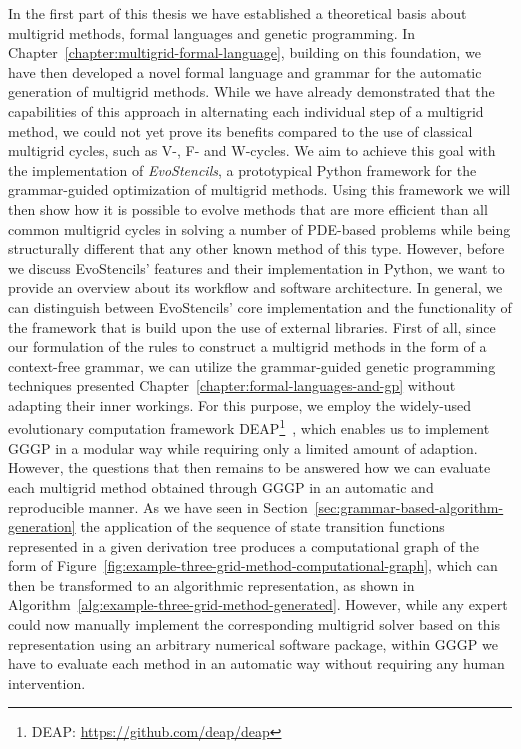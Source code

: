 In the first part of this thesis we have established a theoretical basis about multigrid methods, formal languages and genetic programming.
In Chapter~\ref{chapter:multigrid-formal-language}, building on this foundation, we have then developed a novel formal language and grammar for the automatic generation of multigrid methods. 
While we have already demonstrated that the capabilities of this approach in alternating each individual step of a multigrid method, we could not yet prove its benefits compared to the use of classical multigrid cycles, such as V-, F- and W-cycles.
We aim to achieve this goal with the implementation of \emph{EvoStencils}, a prototypical Python framework for the grammar-guided optimization of multigrid methods.
Using this framework we will then show how it is possible to evolve methods that are more efficient than all common multigrid cycles in solving a number of PDE-based problems while being structurally different that any other known method of this type.
However, before we discuss EvoStencils' features and their implementation in Python, we want to provide an overview about its workflow and software architecture.
In general, we can distinguish between EvoStencils' core implementation and the functionality of the framework that is build upon the use of external libraries.
First of all, since our formulation of the rules to construct a multigrid methods in the form of a context-free grammar, we can utilize the grammar-guided genetic programming techniques presented Chapter~\ref{chapter:formal-languages-and-gp} without adapting their inner workings.
For this purpose, we employ the widely-used evolutionary computation framework DEAP\footnote{DEAP: \url{https://github.com/deap/deap}}~\cite{rainville2012deap}, which enables us to implement GGGP in a modular way while requiring only a limited amount of adaption.
However, the questions that then remains to be answered how we can evaluate each multigrid method obtained through GGGP in an automatic and reproducible manner.
As we have seen in Section~\ref{sec:grammar-based-algorithm-generation} the 
application of the sequence of state transition functions represented in a given derivation tree produces a computational graph of the form of Figure~\ref{fig:example-three-grid-method-computational-graph}, which can then be transformed to an algorithmic representation, as shown in Algorithm~\ref{alg:example-three-grid-method-generated}.
However, while any expert could now manually implement the corresponding multigrid solver based on this representation using an arbitrary numerical software package, within GGGP we have to evaluate each method in an automatic way without requiring any human intervention.

